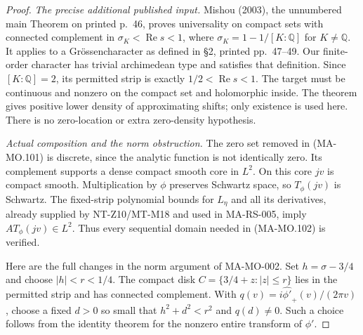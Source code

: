 \begin{proof}
\emph{The precise additional published input.}
Mishou (2003), the unnumbered main Theorem on printed p.~46,
proves universality on compact sets with connected complement
in \(\sigma_K<\operatorname{Re}s<1\), where
\(\sigma_K=1-1/[K:\mathbb Q]\) for \(K\ne\mathbb Q\).
It applies to a Gr\"ossencharacter as defined in \S2,
printed pp.~47--49. Our finite-order character has trivial
archimedean type and satisfies that definition. Since
\([K:\mathbb Q]=2\), its permitted strip is exactly
\(1/2<\operatorname{Re}s<1\). The target must be continuous
and nonzero on the compact set and holomorphic inside. The
theorem gives positive lower density of approximating shifts;
only existence is used here. There is no zero-location or
extra zero-density hypothesis.

\emph{Actual composition and the norm obstruction.}
The zero set removed in (MA-MO.101) is discrete, since the
analytic function is not identically zero. Its complement
supports a dense compact smooth core in \(L^2\). On this
core \(jv\) is compact smooth. Multiplication by \(\phi\)
preserves Schwartz space, so \(T_\phi(jv)\) is Schwartz.
The fixed-strip polynomial bounds for \(L_\eta\) and all
its derivatives, already supplied by NT-Z10/MT-M18 and used
in MA-RS-005, imply \(AT_\phi(jv)\in L^2\). Thus every
sequential domain needed in (MA-MO.102) is verified.

Here are the full changes in the norm argument of MA-MO-002.
Set \(h=\sigma-3/4\) and choose \(|h|<r<1/4\).
The compact disk \(C=\{3/4+z:|z|\le r\}\) lies in the
permitted strip and has connected complement. With
\(q(v)=i\widehat{\phi'}_+(v)/(2\pi v)\), choose a fixed
\(d>0\) so small that \(h^2+d^2<r^2\) and \(q(d)\ne0\).
Such a choice follows from the identity theorem for the
nonzero entire transform of \(\phi'\).


\end{proof}
